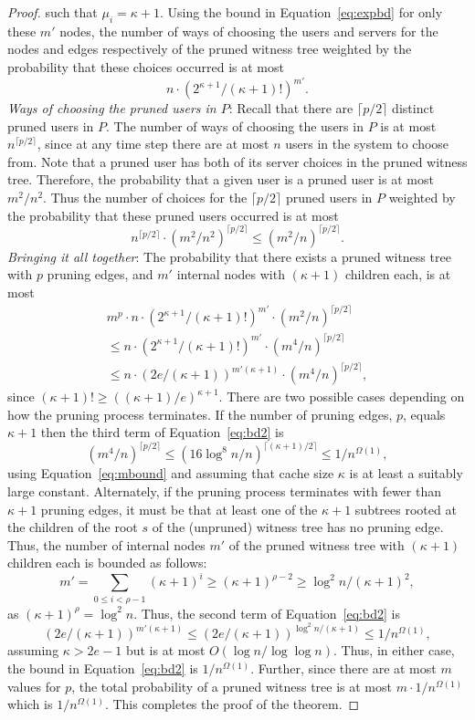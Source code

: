 \documentclass[conference]{IEEEtran}
\begin{document}
\begin{proof}
such that $\mu_i = \kappa + 1$. Using the bound in Equation~\ref{eq:expbd}
for only these $m'$ nodes, the number of ways of choosing the users
and servers for the nodes and edges respectively of the pruned witness tree
weighted by the probability that these choices occurred is at most $$n \cdot (2^{\kappa+1} / (\kappa+1)!)^{m'}.$$
{\em Ways of choosing the pruned users in $P$}: Recall that there are $\lceil p/2 \rceil$ distinct pruned users  in $P$. The number of ways of choosing the users in $P$ is at
most ${n^{\lceil p/2 \rceil}}$, since at any time step there are at most $n$ users in the system to choose from. Note that a pruned user has both of its
server choices in the pruned witness tree. Therefore, the probability that a given user is a pruned user is at most $ m^2/
n^2.$ Thus the number of choices for the
$\lceil p/2 \rceil$ pruned users in $P$ weighted by the probability
that these pruned users occurred is at most
$${n^{\lceil p/2\rceil}} \cdot (m^2 / n^2)^{\lceil p/2
\rceil}
\leq (m^2/ n)^{\lceil p/2 \rceil}.$$
{\em Bringing it all together}: The probability that
there exists a pruned
witness tree with $p$ pruning edges, and $m'$ internal nodes with $(\kappa+1)$ children each, is at most
\begin{eqnarray}
m^ {p} \cdot  n \cdot (2^{\kappa+1} / (\kappa+1)!)^{m'} \cdot  (m^2/ n)^{\lceil p/2 \rceil} \nonumber \\
\leq n \cdot
(2^{\kappa+1} / (\kappa+1)!)^{m'}  \cdot (m^4 /n)^{\lceil p/2 \rceil} \nonumber  \\
\leq n \cdot (2e / (\kappa+1))^{m' (\kappa + 1)}  \cdot (m^4 /n)^{\lceil p/2 \rceil}, 
 \label{eq:bd2}
\end{eqnarray}
since $(\kappa + 1)! \geq ((\kappa + 1)/e)^{\kappa + 1}$.
There are two possible cases depending on how the pruning process terminates. If the number of pruning edges, $p$, equals $\kappa + 1$ then the third term of Equation~\ref{eq:bd2} is 
$$(m^4 /n)^{\lceil p/2 \rceil} \leq (16\log^8 n /n)^{\lceil (\kappa + 1)/2 \rceil} \leq 1/ n^{\Omega(1)},$$
using Equation~\ref{eq:mbound} and assuming that cache size $\kappa$ is at least  a suitably large constant.
Alternately, if the pruning process terminates with fewer than $\kappa + 1$ pruning edges, it must be that at least one of the $\kappa + 1$ subtrees rooted at the children of the root $s$ of the 
(unpruned) witness tree has no pruning edge. Thus, the number of internal nodes $m'$ of the pruned witness tree with $(\kappa + 1)$ children  each is bounded as follows:
$$m' = \sum_{0 \leq i < \rho -1 } (\kappa + 1)^i \geq (\kappa + 1)^{\rho - 2} \geq \log^2 n / (\kappa + 1)^2,$$ 
as $(\kappa + 1)^\rho = \log^2 n$. Thus, the second term of Equation~\ref{eq:bd2} is 
$$(2e / (\kappa+1))^{m' (\kappa + 1)}\leq (2e / (\kappa+1))^{\log^2 n/ (\kappa + 1)} \leq 1/n^{\Omega(1)},$$ 
assuming $\kappa > 2e -1$  but is at most $O(\log n/\log\log n)$.
Thus, in either case, the bound in
Equation~\ref{eq:bd2} is $1/n^{\Omega(1)}$. Further, since there
are at most
$m$ values for $p$, the total probability of a pruned
witness tree is at most
$m \cdot 1/n^{\Omega(1)}$ which is
$1/n^{\Omega(1)}$. This completes the proof of the theorem. 
\end{proof}
\end{document}

